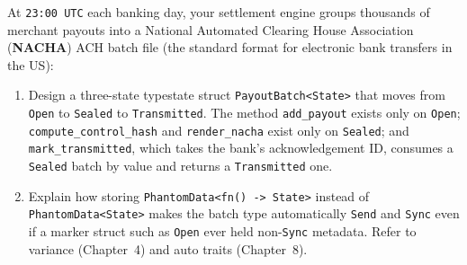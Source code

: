 \begin{exercise}
At \texttt{23:00 UTC} each banking day, your settlement engine groups thousands of merchant payouts into a National Automated Clearing House Association (\textbf{NACHA}) ACH batch file (the standard format for electronic bank transfers in the US):
\begin{enumerate}
  \item Design a three-state typestate struct \texttt{PayoutBatch<State>} that moves from \texttt{Open} to \texttt{Sealed} to \texttt{Transmitted}. The method \texttt{add\_payout} exists only on \texttt{Open}; \texttt{compute\_control\_hash} and \texttt{render\_nacha} exist only on \texttt{Sealed}; and \texttt{mark\_transmitted}, which takes the bank's acknowledgement ID, consumes a \texttt{Sealed} batch by value and returns a \texttt{Transmitted} one.
  \item Explain how storing \texttt{PhantomData<fn() -> State>} instead of \texttt{PhantomData<State>} makes the batch type automatically \texttt{Send} and \texttt{Sync} even if a marker struct such as \texttt{Open} ever held non-\texttt{Sync} metadata. Refer to variance (Chapter~4) and auto traits (Chapter~8).
\end{enumerate}
\end{exercise}
